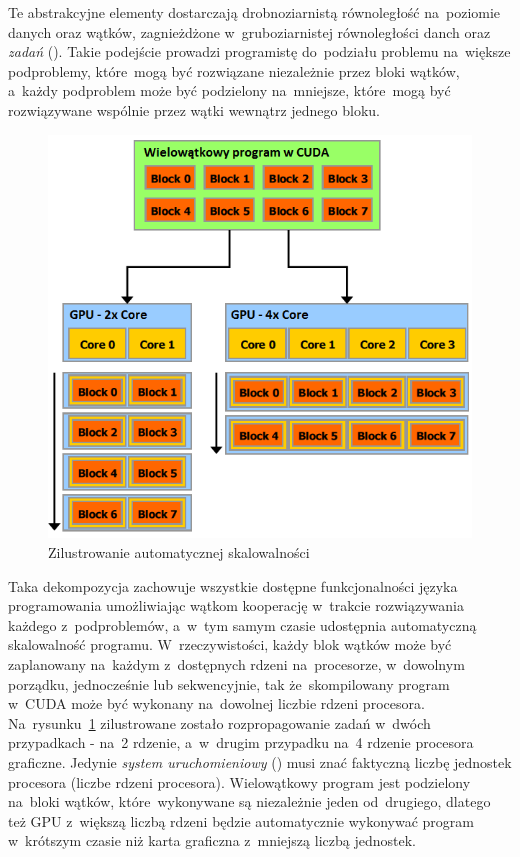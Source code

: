 Te abstrakcyjne elementy dostarczają drobnoziarnistą równoległość na~poziomie danych oraz wątków, zagnieżdżone w~gruboziarnistej równoległości danch oraz \emph{zadań} (). Takie podejście prowadzi programistę do~podziału problemu na~większe podproblemy, które~mogą być rozwiązane niezależnie przez bloki wątków, a~każdy podproblem może być podzielony na~mniejsze, które~mogą być rozwiązywane wspólnie przez wątki wewnątrz jednego bloku.

\begin{figure}
\centering\includegraphics[width=1.0\textwidth]{figures/03/threads_gpu.png}
\caption{Zilustrowanie automatycznej skalowalności~\cite{Cuda:PGuide}}\label{rys:threads_gpu}
\end{figure}

Taka dekompozycja zachowuje wszystkie dostępne funkcjonalności języka programowania umożliwiając wątkom kooperację w~trakcie rozwiązywania każdego z~podproblemów, a~w~tym samym czasie udostępnia automatyczną skalowalność programu. W~rzeczywistości, każdy blok wątków może być zaplanowany na~każdym z~dostępnych rdzeni na~procesorze, w~dowolnym porządku, jednocześnie lub sekwencyjnie, tak że~skompilowany program w~CUDA może być wykonany na~dowolnej liczbie rdzeni procesora. Na~rysunku~\ref{rys:threads_gpu} zilustrowane zostało rozpropagowanie zadań w~dwóch przypadkach - na~2 rdzenie, a~w~drugim przypadku na~4 rdzenie procesora graficzne. Jedynie \emph{system uruchomieniowy} () musi znać faktyczną liczbę jednostek procesora (liczbe rdzeni procesora). Wielowątkowy program jest podzielony na~bloki wątków, które~wykonywane są niezależnie jeden od~drugiego, dlatego też GPU z~większą liczbą rdzeni będzie automatycznie wykonywać program w~krótszym czasie niż karta graficzna z~mniejszą liczbą jednostek.


